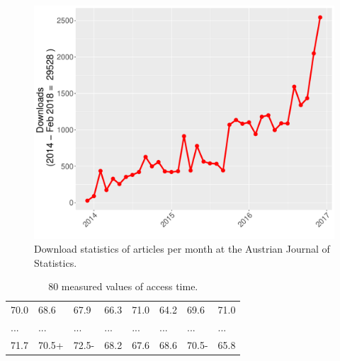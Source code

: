 \documentclass[article]{ajs}
\begin{document}
\begin{figure}[hbt]
\begin{center}
\includegraphics{ajs-download20180210}
\caption{\label{Fig3.4}Download statistics of articles per month at the Austrian Journal of Statistics.} 
\end{center}
\end{figure}

\begin{table}[hbt]
\caption{\label{Tab3.4}80 measured values of access time.}
\vspace*{-5mm}
\small
\hspace{1.5cm}
\begin{center}
\begin{tabular}{|llllllll|}
\toprule
70.0 & 68.6 & 67.9 & 66.3 & 71.0 & 64.2 & 69.6 & 71.0\\
... & ... & ... & ... & ... & ... & ... & ...\\
71.7 & 70.5+& 72.5-& 68.2 & 67.6 & 68.6 & 70.5-& 65.8\\
\bottomrule
\end{tabular}
\end{center}
\end{table}
\end{document}
